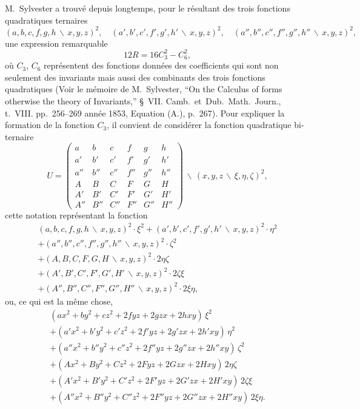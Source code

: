 \documentclass[11pt,a4paper]{article}
\theoremstyle{definition}
\begin{document}
M.~Sylvester a trouv\'{e} depuis longtemps, pour le r\'{e}sultant des trois fonctions
quadratiques ternaires
\[
(a,b,c,f,g,h\,\backslash\!\!\,x,y,z)^{2},\quad
(a',b',c',f',g',h'\,\backslash\!\!\,x,y,z)^{2},\quad
(a'',b'',c'',f'',g'',h''\,\backslash\!\!\,x,y,z)^{2},
\]
une expression remarquable
\[12R = 16C_{3}^{2} - C_{6}^{2},\]
o\`{u} $C_{3}$, $C_{6}$ repr\'{e}sentent des fonctions donn\'{e}es des coefficients qui sont
non seulement des invariants mais aussi des combinants des trois fonctions quadratiques
(Voir le m\'{e}moire de M.~Sylvester, ``On the Calculus of forms otherwise the theory
of Invariants,'' \S~VII. Camb.~et~Dub.~Math.~Journ., t.~VIII. pp.~256--269 ann\'{e}e 1853,
Equation (A.), p.~267). Pour expliquer la formation de la fonction $C_{3}$, il convient
de consid\'{e}rer la fonction quadratique bi-ternaire
\[
U = \begin{pmatrix}
a & b & c & f & g & h \\
a' & b' & c' & f' & g' & h' \\
a'' & b'' & c'' & f'' & g'' & h'' \\
A & B & C & F & G & H \\
A' & B' & C' & F' & G' & H' \\
A'' & B'' & C'' & F'' & G'' & H''
\end{pmatrix}\!\!\,\backslash\!\!\,(x,y,z\,\backslash\!\!\,\xi,\eta,\zeta)^{2},
\]
cette notation repr\'{e}sentant la fonction
\begin{multline*}
(a,b,c,f,g,h\,\backslash\!\!\,x,y,z)^{2}\cdot\xi^{2}
+ (a',b',c',f',g',h'\,\backslash\!\!\,x,y,z)^{2}\cdot\eta^{2} \\
+ (a'',b'',c'',f'',g'',h''\,\backslash\!\!\,x,y,z)^{2}\cdot\zeta^{2} \\
+ (A,B,C,F,G,H\,\backslash\!\!\,x,y,z)^{2}\cdot2\eta\zeta \\
+ (A',B',C',F',G',H'\,\backslash\!\!\,x,y,z)^{2}\cdot2\zeta\xi \\
+ (A'',B'',C'',F'',G'',H''\,\backslash\!\!\,x,y,z)^{2}\cdot2\xi\eta,
\end{multline*}
ou, ce qui est la m\^{e}me chose,
\begin{multline*}
(ax^{2}+by^{2}+cz^{2}+2fyz+2gzx+2hxy)\,\xi^{2} \\
+ (a'x^{2}+b'y^{2}+c'z^{2}+2f'yz+2g'zx+2h'xy)\,\eta^{2} \\
+ (a''x^{2}+b''y^{2}+c''z^{2}+2f''yz+2g''zx+2h''xy)\,\zeta^{2} \\
+ (Ax^{2}+By^{2}+Cz^{2}+2Fyz+2Gzx+2Hxy)\,2\eta\zeta \\
+ (A'x^{2}+B'y^{2}+C'z^{2}+2F'yz+2G'zx+2H'xy)\,2\zeta\xi \\
+ (A''x^{2}+B''y^{2}+C''z^{2}+2F''yz+2G''zx+2H''xy)\,2\xi\eta.
\end{multline*}
\end{document}
